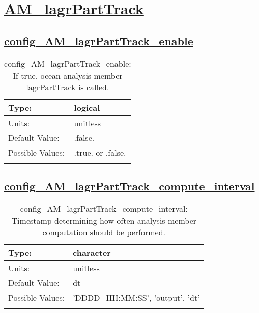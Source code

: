\section[AM\_lagrPartTrack]{\hyperref[sec:nm_tab_AM_lagrPartTrack]{AM\_lagrPartTrack}}
\label{sec:nm_sec_AM_lagrPartTrack}
\subsection[config\_AM\_lagrPartTrack\_enable]{\hyperref[sec:nm_tab_AM_lagrPartTrack]{config\_AM\_lagrPartTrack\_enable}}
\label{subsec:nm_sec_config_AM_lagrPartTrack_enable}
\begin{center}
\begin{longtable}{| p{2.0in} || p{4.0in} |}
    \hline
    Type: & logical \\
    \hline
    Units: & \si{unitless} \\
    \hline
    Default Value: & .false. \\
    \hline
    Possible Values: & .true. or .false. \\
    \hline
    \caption{config\_AM\_lagrPartTrack\_enable: If true, ocean analysis member lagrPartTrack is called.}
\end{longtable}
\end{center}
\subsection[config\_AM\_lagrPartTrack\_compute\_interval]{\hyperref[sec:nm_tab_AM_lagrPartTrack]{config\_AM\_lagrPartTrack\_compute\_interval}}
\label{subsec:nm_sec_config_AM_lagrPartTrack_compute_interval}
\begin{center}
\begin{longtable}{| p{2.0in} || p{4.0in} |}
    \hline
    Type: & character \\
    \hline
    Units: & \si{unitless} \\
    \hline
    Default Value: & dt \\
    \hline
    Possible Values: & 'DDDD\_HH:MM:SS', 'output', 'dt' \\
    \hline
    \caption{config\_AM\_lagrPartTrack\_compute\_interval: Timestamp determining how often analysis member computation should be performed.}
\end{longtable}
\end{center}
